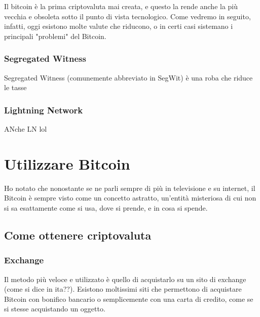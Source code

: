 \documentclass {article}
\begin{document}
Il bitcoin è la prima criptovaluta mai creata, e questo la rende anche la più vecchia e obsoleta sotto il punto di vista tecnologico. Come vedremo in seguito, infatti, oggi esistono molte valute che riducono, o in certi casi sistemano i principali "problemi" del Bitcoin.



\subsubsection {Segregated Witness}



Segregated Witness (comunemente abbreviato in SegWit) è una roba che riduce le tasse



\subsubsection {Lightning Network}



ANche LN lol



\section {Utilizzare Bitcoin}



Ho notato che nonostante se ne parli sempre di più in televisione e su internet, il Bitcoin è sempre visto come un concetto astratto, un'entità misteriosa di cui non si sa esattamente come si usa, dove si prende, e in cosa si spende.



\subsection {Come ottenere criptovaluta}



\subsubsection {Exchange}



Il metodo più veloce e utilizzato è quello di acquistarlo su un sito di exchange (come si dice in ita??). Esistono moltissimi siti che permettono di acquistare Bitcoin con bonifico bancario o semplicemente con una carta di credito, come se si stesse acquistando un oggetto.
\end{document}
